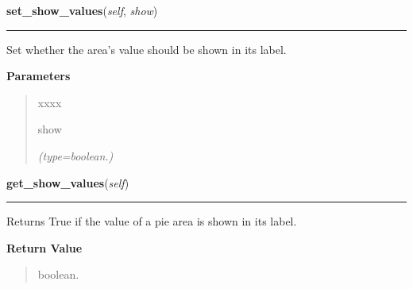     \label{pygtk_chart:pie_chart:PieChart:set_show_values}

    \vspace{0.5ex}

\hspace{.8\funcindent}\begin{boxedminipage}{\funcwidth}

    \raggedright \textbf{set\_show\_values}(\textit{self}, \textit{show})

    \vspace{-1.5ex}

    \rule{\textwidth}{0.5\fboxrule}
\setlength{\parskip}{2ex}
    Set whether the area's value should be shown in its label.

\setlength{\parskip}{1ex}
      \textbf{Parameters}
      \vspace{-1ex}

      \begin{quote}
        \begin{Ventry}{xxxx}

          \item[show]

            {\it (type=boolean.)}

        \end{Ventry}

      \end{quote}

    \end{boxedminipage}

    \label{pygtk_chart:pie_chart:PieChart:get_show_values}

    \vspace{0.5ex}

\hspace{.8\funcindent}\begin{boxedminipage}{\funcwidth}

    \raggedright \textbf{get\_show\_values}(\textit{self})

    \vspace{-1.5ex}

    \rule{\textwidth}{0.5\fboxrule}
\setlength{\parskip}{2ex}
    Returns True if the value of a pie area is shown in its label.

\setlength{\parskip}{1ex}
      \textbf{Return Value}
    \vspace{-1ex}

      \begin{quote}
      boolean.

      \end{quote}

    \end{boxedminipage}


